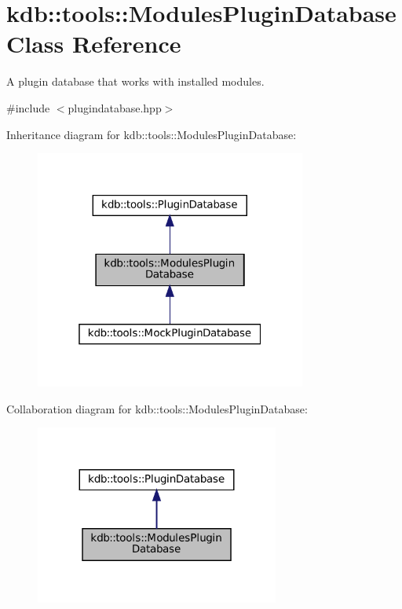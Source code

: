 \hypertarget{classkdb_1_1tools_1_1ModulesPluginDatabase}{}\section{kdb\+::tools\+::Modules\+Plugin\+Database Class Reference}
\label{classkdb_1_1tools_1_1ModulesPluginDatabase}


A plugin database that works with installed modules.  




{\ttfamily \#include $<$plugindatabase.\+hpp$>$}



Inheritance diagram for kdb\+::tools\+::Modules\+Plugin\+Database\+:
\nopagebreak
\begin{figure}[H]
\begin{center}
\leavevmode
\includegraphics[width=253pt]{classkdb_1_1tools_1_1ModulesPluginDatabase__inherit__graph}
\end{center}
\end{figure}


Collaboration diagram for kdb\+::tools\+::Modules\+Plugin\+Database\+:
\nopagebreak
\begin{figure}[H]
\begin{center}
\leavevmode
\includegraphics[width=227pt]{classkdb_1_1tools_1_1ModulesPluginDatabase__coll__graph}
\end{center}
\end{figure}
